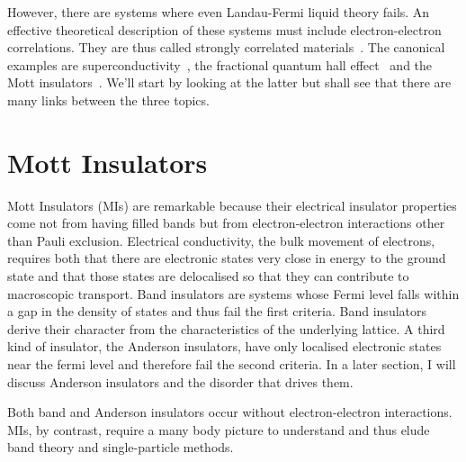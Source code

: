 However, there are systems where even Landau-Fermi liquid theory fails. An effective theoretical description of these systems must include electron-electron correlations. They are thus called strongly correlated materials~\autocite{morosanStronglyCorrelatedMaterials2012}. The canonical examples are superconductivity~\autocite{MicroscopicTheorySuperconductivity}, the fractional quantum hall effect~\autocite{feldmanFractionalChargeFractional2021} and the Mott insulators~\autocite{mottBasisElectronTheory1949,fisherMottInsulatorsSpin1999}. We'll start by looking at the latter but shall see that there are many links between the three topics.

\hypertarget{mott-insulators}{%
\section{Mott Insulators}\label{mott-insulators}}

Mott Insulators (MIs) are remarkable because their electrical insulator properties come not from having filled bands but from electron-electron interactions other than Pauli exclusion. Electrical conductivity, the bulk movement of electrons, requires both that there are electronic states very close in energy to the ground state and that those states are delocalised so that they can contribute to macroscopic transport. Band insulators are systems whose Fermi level falls within a gap in the density of states and thus fail the first criteria. Band insulators derive their character from the characteristics of the underlying lattice. A third kind of insulator, the Anderson insulators, have only localised electronic states near the fermi level and therefore fail the second criteria. In a later section, I will discuss Anderson insulators and the disorder that drives them.

Both band and Anderson insulators occur without electron-electron interactions. MIs, by contrast, require a many body picture to understand and thus elude band theory and single-particle methods.

